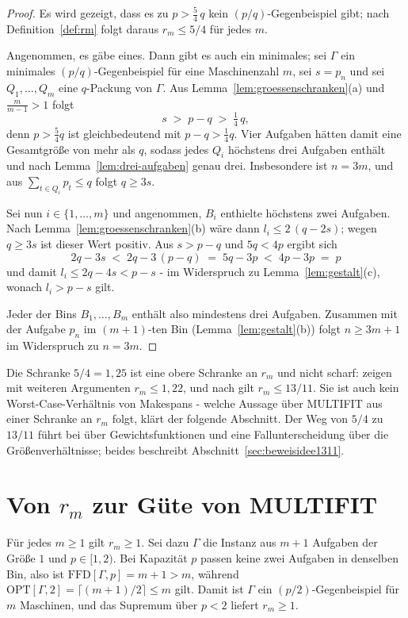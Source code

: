 \begin{proof}
Es wird gezeigt, dass es zu $p > \frac{5}{4}\,q$ kein $(p/q)$-Gegenbeispiel gibt; nach
Definition~\ref{def:rm} folgt daraus $r_m \le 5/4$ für jedes $m$.

Angenommen, es gäbe eines.
Dann gibt es auch ein minimales; sei $\Gamma$ ein minimales $(p/q)$-Gegen\-bei\-spiel für eine
Maschinenzahl $m$, sei $s = p_n$ und sei $Q_1, \ldots, Q_m$ eine $q$-Packung von $\Gamma$.
Aus Lemma~\ref{lem:groessenschranken}(a) und $\frac{m}{m-1} > 1$ folgt
\[
  s \;>\; p - q \;>\; \tfrac{1}{4}\,q ,
\]
denn $p > \frac{5}{4} q$ ist gleichbedeutend mit $p - q > \frac{1}{4} q$.
Vier Aufgaben hätten damit eine Gesamtgröße von mehr als $q$, sodass jedes $Q_i$ höchstens drei
Aufgaben enthält und nach Lemma~\ref{lem:drei-aufgaben} genau drei.
Insbesondere ist $n = 3m$, und aus $\sum_{t \in Q_i} p_t \le q$ folgt $q \ge 3s$.

Sei nun $i \in \{1, \ldots, m\}$ und angenommen, $B_i$ enthielte höchstens zwei Aufgaben.
Nach Lemma~\ref{lem:groessenschranken}(b) wäre dann $l_i \le 2\,(q - 2s)$; wegen $q \ge 3s$ ist
dieser Wert positiv.
Aus $s > p - q$ und $5q < 4p$ ergibt sich
\[
  2q - 3s \;<\; 2q - 3\,(p-q) \;=\; 5q - 3p \;<\; 4p - 3p \;=\; p
\]
und damit $l_i \le 2q - 4s < p - s$ - im Widerspruch zu Lemma~\ref{lem:gestalt}(c), wonach
$l_i > p - s$ gilt.

Jeder der Bins $B_1, \ldots, B_m$ enthält also mindestens drei Aufgaben.
Zusammen mit der Aufgabe $p_n$ im $(m+1)$-ten Bin (Lemma~\ref{lem:gestalt}(b)) folgt
$n \ge 3m + 1$ im Widerspruch zu $n = 3m$.
\end{proof}

Die Schranke $5/4 = 1{,}25$ ist eine obere Schranke an $r_m$ und nicht scharf:
\textcite{coffman1978} zeigen mit weiteren Argumenten $r_m \le 1{,}22$, und nach
\textcite{cao1995} gilt $r_m \le 13/11$.
Sie ist auch kein Worst-Case-Verhältnis von Makespans - welche Aussage über MULTIFIT aus einer
Schranke an $r_m$ folgt, klärt der folgende Abschnitt.
Der Weg von $5/4$ zu $13/11$ führt bei \textcite{cao1995} über Gewichtsfunktionen und eine
Fallunterscheidung über die Größenverhältnisse; beides beschreibt
Abschnitt~\ref{sec:beweisidee1311}.

\section{Von \texorpdfstring{$r_m$}{rm} zur Güte von MULTIFIT}
\label{sec:guete-multifit}

\begin{bemerkung}
\label{bem:rm-mindestens-eins}
Für jedes $m \ge 1$ gilt $r_m \ge 1$.
Sei dazu $\Gamma$ die Instanz aus $m+1$ Aufgaben der Größe $1$ und $p \in [1, 2)$.
Bei Kapazität $p$ passen keine zwei Aufgaben in denselben Bin, also ist
$\mathrm{FFD}[\Gamma, p] = m+1 > m$, während $\mathrm{OPT}[\Gamma, 2] = \lceil (m+1)/2 \rceil
\le m$ gilt.
Damit ist $\Gamma$ ein $(p/2)$-Gegenbeispiel für $m$ Maschinen, und das Supremum über $p < 2$
liefert $r_m \ge 1$.
\end{bemerkung}

